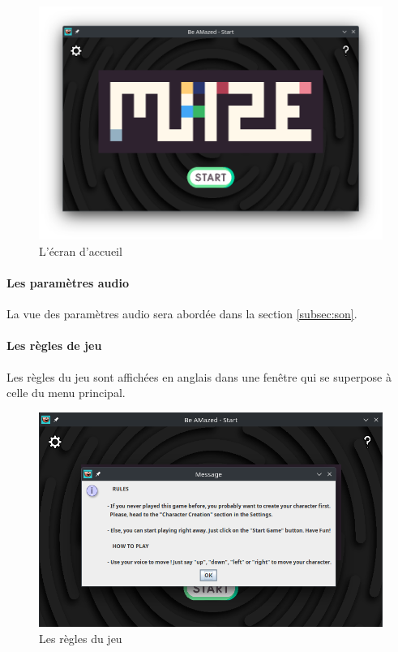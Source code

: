 \begin{figure}[h!]
    \centering
    \includegraphics[scale=0.4]{ressources/Implementation/Labyrinthe/Controleur/StartMenu.png}%
    \caption{L'écran d'accueil}
    \label{fig:StartMenu}
\end{figure}

\paragraph{Les paramètres audio}

La vue des paramètres audio sera abordée dans la section \ref{subsec:son}.

\paragraph{Les règles de jeu}

Les règles du jeu sont affichées en anglais dans une fenêtre qui se superpose à celle du menu principal.

\begin{figure}[h!]
    \centering
    \includegraphics[scale=0.4]{ressources/Implementation/Labyrinthe/Controleur/Rules.png}%
    \caption{Les règles du jeu}
    \label{fig:Rules}
\end{figure}

